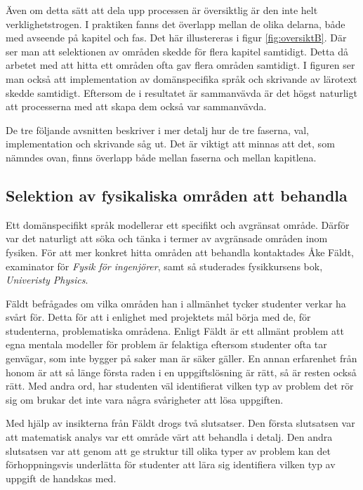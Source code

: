 \begin{binge}
Även om detta sätt att dela upp processen är översiktlig är den inte helt
verklighetstrogen. I praktiken fanns det överlapp mellan de olika delarna, både
med avseende på kapitel och fas. Det här illustereras i figur
\ref{fig:oversiktB}. Där ser man att selektionen av områden skedde för flera
kapitel samtidigt. Detta då arbetet med att hitta ett områden ofta gav flera
områden samtidigt. I figuren ser man också att implementation av domänspecifika
språk och skrivande av lärotext skedde samtidigt. Eftersom de i resultatet är
sammanvävda är det högst naturligt att processerna med att skapa dem också var
sammanvävda.

De tre följande avsnitten beskriver i mer detalj hur de tre faserna, val,
implementation och skrivande såg ut. Det är viktigt att minnas att det, som
nämndes ovan, finns överlapp både mellan faserna och mellan kapitlena.

\subsection{Selektion av fysikaliska områden att behandla}
\label{sec:selektion}

Ett domänspecifikt språk modellerar ett specifikt och avgränsat område. Därför
var det naturligt att söka och tänka i termer av avgränsade områden inom
fysiken. För att mer konkret hitta områden att behandla kontaktades Åke Fäldt,
examinator för \textit{Fysik för ingenjörer}, samt så studerades fysikkursens
bok, \textit{Univeristy Physics}.

Fäldt befrågades om vilka områden han i allmänhet tycker studenter verkar ha
svårt för. Detta för att i enlighet med projektets mål börja med de, för
studenterna, problematiska områdena. Enligt Fäldt är ett allmänt problem att
egna mentala modeller för problem är felaktiga eftersom studenter ofta tar
genvägar, som inte bygger på saker man är säker gäller. En annan erfarenhet
från honom är att så länge första raden i en uppgiftslösning är rätt, så är
resten också rätt. Med andra ord, har studenten väl identifierat vilken typ av
problem det rör sig om brukar det inte vara några svårigheter att lösa
uppgiften.

Med hjälp av insikterna från Fäldt drogs två slutsatser. Den första slutsatsen
var att matematisk analys var ett område värt att behandla i detalj. Den andra
slutsatsen var att genom att ge struktur till olika typer av problem kan det
förhoppningsvis underlätta för studenter att lära sig identifiera vilken
typ av uppgift de handskas med.


\end{binge}
